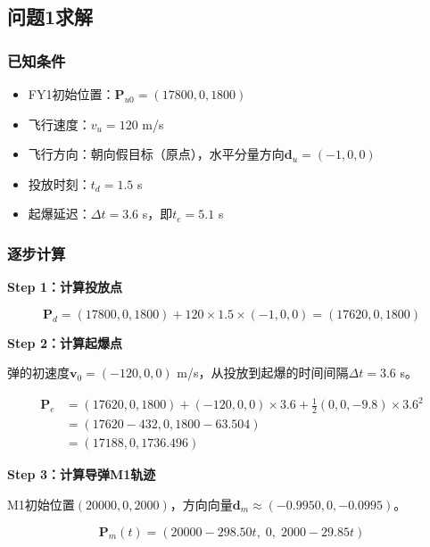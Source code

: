\documentclass[12pt,a4paper]{article}
\newcommand{\vect}[1]{\boldsymbol{#1}}
\begin{document}
\subsection{问题1求解}

\subsubsection{已知条件}

\begin{itemize}
    \item FY1初始位置：$\vect{P}_{u0} = (17800, 0, 1800)$
    \item 飞行速度：$v_u = 120$ m/s
    \item 飞行方向：朝向假目标（原点），水平分量方向$\vect{d}_u = (-1, 0, 0)$
    \item 投放时刻：$t_d = 1.5$ s
    \item 起爆延迟：$\Delta t = 3.6$ s，即$t_e = 5.1$ s
\end{itemize}

\subsubsection{逐步计算}

\textbf{Step 1：计算投放点}

\begin{equation}
    \vect{P}_d = (17800, 0, 1800) + 120 \times 1.5 \times (-1, 0, 0) = (17620, 0, 1800)
\end{equation}

\textbf{Step 2：计算起爆点}

弹的初速度$\vect{v}_0 = (-120, 0, 0)$ m/s，从投放到起爆的时间间隔$\Delta t = 3.6$ s。

\begin{align}
    \vect{P}_e &= (17620, 0, 1800) + (-120, 0, 0) \times 3.6 + \frac{1}{2}(0, 0, -9.8) \times 3.6^2 \nonumber \\
    &= (17620 - 432, 0, 1800 - 63.504) \nonumber \\
    &= (17188, 0, 1736.496)
\end{align}

\textbf{Step 3：计算导弹M1轨迹}

M1初始位置$(20000, 0, 2000)$，方向向量$\vect{d}_m \approx (-0.9950, 0, -0.0995)$。

\begin{equation}
    \vect{P}_m(t) = (20000 - 298.50t, \; 0, \; 2000 - 29.85t)
\end{equation}
\end{document}
